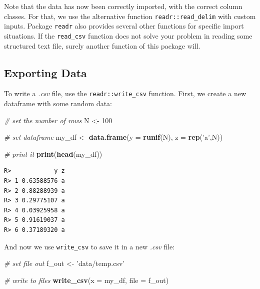 \documentclass[
  12pt,
]{book}
\newenvironment{Shaded}{\begin{snugshade}}{\end{snugshade}}
\newcommand{\CommentTok}[1]{\textcolor[rgb]{0.37,0.37,0.37}{\textit{#1}}}
\newcommand{\DataTypeTok}[1]{\textcolor[rgb]{0.27,0.27,0.27}{#1}}
\newcommand{\DecValTok}[1]{\textcolor[rgb]{0.06,0.06,0.06}{#1}}
\newcommand{\KeywordTok}[1]{\textcolor[rgb]{0.27,0.27,0.27}{\textbf{#1}}}
\newcommand{\NormalTok}[1]{#1}
\newcommand{\StringTok}[1]{\textcolor[rgb]{0.5,0.5,0.5}{#1}}
\begin{document}
Note that the data has now been correctly imported, with the correct column classes. For that, we use the alternative function \texttt{readr::read\_delim} with custom inputs. Package \texttt{readr} also provides several other functions for specific import situations. If the \texttt{read\_csv} function does not solve your problem in reading some structured text file, surely another function of this package will.

\hypertarget{exporting-data}{%
\subsection{Exporting Data}\label{exporting-data}}

To write a \emph{.csv} file, use the \texttt{readr::write\_csv} function. First, we create a new dataframe with some random data:  

\begin{Shaded}
\begin{Highlighting}[]
\CommentTok{# set the number of rows}
\NormalTok{N <-}\StringTok{ }\DecValTok{100}

\CommentTok{# set dataframe}
\NormalTok{my_df <-}\StringTok{ }\KeywordTok{data.frame}\NormalTok{(}\DataTypeTok{y =} \KeywordTok{runif}\NormalTok{(N), }
                    \DataTypeTok{z =} \KeywordTok{rep}\NormalTok{(}\StringTok{'a'}\NormalTok{,N))}

\CommentTok{# print it}
\KeywordTok{print}\NormalTok{(}\KeywordTok{head}\NormalTok{(my_df))}
\end{Highlighting}
\end{Shaded}

\begin{verbatim}
R>            y z
R> 1 0.63588576 a
R> 2 0.88288939 a
R> 3 0.29775107 a
R> 4 0.03925958 a
R> 5 0.91619037 a
R> 6 0.37189320 a
\end{verbatim}

And now we use \texttt{write\_csv} to save it in a new \emph{.csv} file:

\begin{Shaded}
\begin{Highlighting}[]
\CommentTok{# set file out}
\NormalTok{f_out <-}\StringTok{ 'data/temp.csv'}

\CommentTok{# write to files}
\KeywordTok{write_csv}\NormalTok{(}\DataTypeTok{x =}\NormalTok{ my_df,  }
          \DataTypeTok{file =}\NormalTok{ f_out)}
\end{Highlighting}
\end{Shaded}
\end{document}
